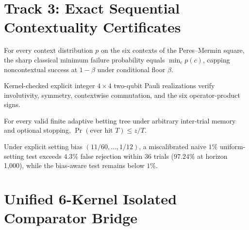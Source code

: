 \section{Track 3: Exact Sequential Contextuality Certificates}

\begin{theorem}
\label{thm:pm-setting-bias}
\leanok
For every context distribution $p$ on the six contexts of the Peres–Mermin square, the sharp classical minimum failure probability equals $\min_c p(c)$, capping noncontextual success at $1 - \beta$ under conditional floor $\beta$.
\end{theorem}

\begin{proposition}
\label{thm:pm-ideal-pauli}
\leanok
Kernel-checked explicit integer $4 \times 4$ two-qubit Pauli realizations verify involutivity, symmetry, contextwise commutation, and the six operator-product signs.
\end{proposition}

\begin{theorem}
\label{thm:sequential-hitting}
\leanok
For every valid finite adaptive betting tree under arbitrary inter-trial memory and optional stopping, $\Pr(\text{ever hit } T) \le z / T$.
\end{theorem}

\begin{theorem}
\label{thm:miscalibration-attack}
\leanok
Under explicit setting bias $(11/60,\dots,1/12)$, a miscalibrated naive $1\%$ uniform-setting test exceeds $4.3\%$ false rejection within 36 trials ($97.24\%$ at horizon 1,000), while the bias-aware test remains below $1\%$.
\end{theorem}

\section{Unified 6-Kernel Isolated Comparator Bridge}


